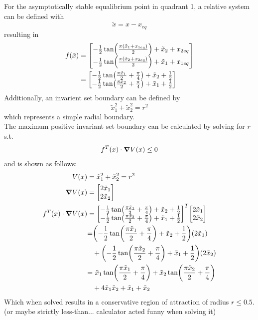 \documentclass[letter]{article}
\numberwithin{equation}{section}
\begin{document}
For the asymptotically stable equalibrium point in quadrant 1, a relative system can be defined with $$\tilde{x} = x-x_{eq}$$ resulting in
\begin{align}
	f(\tilde{x}) 
	&= \mqty[-\frac{1}{2} \tan(\frac{\pi (\tilde{x}_1 + x_{1eq})}{2}) + \tilde{x}_2 + x_{2eq}\\ -\frac{1}{2} \tan(\frac{\pi (\tilde{x}_2 + x_{2eq})}{2}) + \tilde{x}_1 + x_{1eq}]\\
	&= \mqty[-\frac{1}{2} \tan(\frac{\pi \tilde{x}_1}{2} + \frac{\pi}{4}) + \tilde{x}_2 + \frac{1}{2}\\ -\frac{1}{2} \tan(\frac{\pi \tilde{x}_2}{2} + \frac{\pi}{4}) + \tilde{x}_1 + \frac{1}{2}]
\end{align}
Additionally, an invarient set boundary can be defined by $$\tilde{x}_1^2 + \tilde{x}_2^2 = r^2$$ which represents a simple radial boundary.\\
The maximum positive invariant set boundary can be calculated by solving for $r$ s.t. $$f^T(x) \cdot \grad{V(x)} \leq 0$$ and is shown as follows:
\begin{align}
	V(x) &= \tilde{x}_1^2 + \tilde{x}_2^2 = r^2\\
	\grad{V(x)} &= \mqty[2 \tilde{x}_1\\ 2 \tilde{x}_2]\\
	f^T(x) \cdot \grad{V(x)} &= \mqty[-\frac{1}{2} \tan(\frac{\pi \tilde{x}_1}{2} + \frac{\pi}{4}) + \tilde{x}_2 + \frac{1}{2}\\ -\frac{1}{2} \tan(\frac{\pi \tilde{x}_2}{2} + \frac{\pi}{4}) + \tilde{x}_1 + \frac{1}{2}]^T \mqty[2 \tilde{x}_1\\ 2 \tilde{x}_2]\\
	&\begin{aligned}
		=&\qty(-\frac{1}{2} \tan(\frac{\pi \tilde{x}_1}{2} + \frac{\pi}{4}) + \tilde{x}_2 + \frac{1}{2})(2\tilde{x}_1)\\
		&+\qty(-\frac{1}{2} \tan(\frac{\pi \tilde{x}_2}{2} + \frac{\pi}{4}) + \tilde{x}_1 + \frac{1}{2})(2\tilde{x}_2)
	\end{aligned}\\
	&\begin{aligned}
		=& \ \tilde{x}_1\tan(\frac{\pi \tilde{x}_1}{2} + \frac{\pi}{4}) + \tilde{x}_2 \tan(\frac{\pi \tilde{x}_2}{2} + \frac{\pi}{4})\\
		&+4\tilde{x}_1 \tilde{x}_2 + \tilde{x}_1 +\tilde{x}_2
	\end{aligned}
\end{align}
Which when solved results in a conservative region of attraction of radius $r\leq0.5$. (or maybe strictly less-than... calculator acted funny when solving it)
\end{document}
